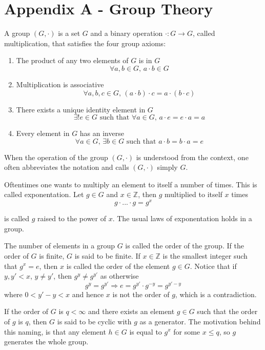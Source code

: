 \clearpage
\section{Appendix A - Group Theory}

A group $(G, \cdot)$ is a set $G$ and a binary operation $\cdot: G \to G$, called
multiplication, that satisfies the four group axioms:
\begin{enumerate}
\item The product of any two elements of $G$ is in $G$
$$\forall a,b \in G, \, a\cdot b \in G$$

\item Multiplication is associative 
$$
\forall a,b,c \in G, \, (a\cdot b)\cdot c = a \cdot (b \cdot c)
$$ 
\item There exists a unique identity element in $G$
$$
\exists! e \in G \text{ such that } \forall a \in G, \, a \cdot e = e \cdot a = a
$$
\item Every element in $G$ has an inverse
$$
\forall a \in G, \, \exists b \in G \text{ such that } a \cdot b = b \cdot a = e
$$
\end{enumerate}

When the operation of the group $(G, \cdot)$ is understood from the
context, one often abbreviates the notation and calls $(G, \cdot)$
simply $G$.

Oftentimes one wants to multiply an element to itself a number of
times. This is called exponentation. Let $g \in G$ and
$x \in \mathbb{Z}$, then $g$ multiplied to itself $x$ times
$$
g \cdot ... \cdot g = g^x
$$

is called $g$ raised to the power of $x$. The usual laws of
exponentation holds in a group.

The number of elements in a group $G$ is called the order of the
group. If the order of $G$ is finite, $G$ is said to be finite. If
$x \in \mathbb{Z}$ is the smallest integer such that $g^x = e$, then
$x$ is called the order of the element $g \in G$. Notice that if
$y,y' < x$, $y \neq y'$, then $g^y \neq g^{y'}$ as otherwise
$$
g^y = g^{y'} \Rightarrow e = g^{y'} \cdot g^{-y} = g^{y' - y}
$$
where $0 < y' - y < x$ and hence $x$ is not the order of $g$, which is
a contradiction.

If the order of $G$ is $q < \infty$ and there exists an element $g \in
G$ such that the order of $g$ is $q$, then $G$ is said to be cyclic
with $g$ as a generator. The motivation behind this naming, is that
any element $h \in G$ is equal to $g^x$ for some $x \le q$, so $g$
generates the whole group.




